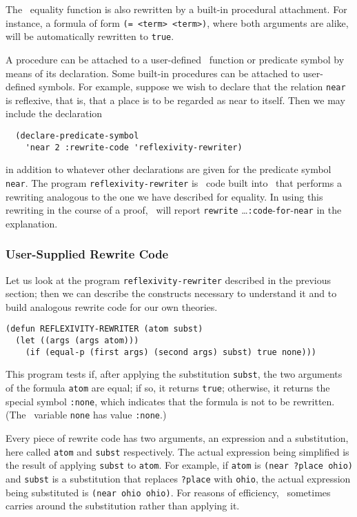 The \snark\   equality function is also rewritten by a built-in procedural
attachment.  For instance, a formula of form \verb'(= <term> <term>)', where both
arguments are alike, will be automatically rewritten to {\tt true}.

A procedure can be attached to a user-defined \snark\  function or predicate
symbol by means of its declaration.  Some built-in procedures can be attached
to user-defined symbols.  For example, suppose we wish to declare that the
relation  {\tt near} is reflexive, that is, that a place is to be regarded as
near to itself.  Then we may include the declaration
\begin{verbatim}
  (declare-predicate-symbol
    'near 2 :rewrite-code 'reflexivity-rewriter)
\end{verbatim}
in addition to whatever other declarations are given for the predicate symbol
{\tt near}.  The program {\tt reflexivity-rewriter} is \lisp\  code built into
\snark\  that performs a rewriting analogous to the one we have described for
equality.  In using this rewriting in the course of a proof, \snark\  will
report {\tt rewrite} \ldots {\tt :code}-{\tt for}-{\tt near} in the
explanation.

\subsubsection{User-Supplied Rewrite Code}
 Let us look at the program {\tt reflexivity-rewriter} described in the
previous section; then we can describe the constructs necessary to understand
it and to build analogous rewrite code for our own theories.
\begin{verbatim}
(defun REFLEXIVITY-REWRITER (atom subst)
  (let ((args (args atom)))
    (if (equal-p (first args) (second args) subst) true none)))
\end{verbatim}

This program tests if, after applying the substitution {\tt subst}, the two
arguments of the formula {\tt atom} are equal; if so, it returns {\tt true};
otherwise, it returns the special symbol {\tt :none}, which indicates that
the formula is not to be rewritten.  (The \lisp\   variable {\tt none}
has value {\tt :none}.)

Every piece of rewrite code has two arguments, an expression and a
substitution, here called {\tt atom} and {\tt subst} respectively.
The actual expression being simplified is the result of applying {\tt subst}
to {\tt atom}.  For example, if {\tt atom} is \verb'(near ?place ohio)'
and {\tt subst} is a substitution that replaces {\tt ?place} with {\tt ohio},
the actual expression being substituted is \verb'(near ohio ohio)'.  For
reasons of efficiency, \Snark\   sometimes
carries around the substitution rather than applying it.

